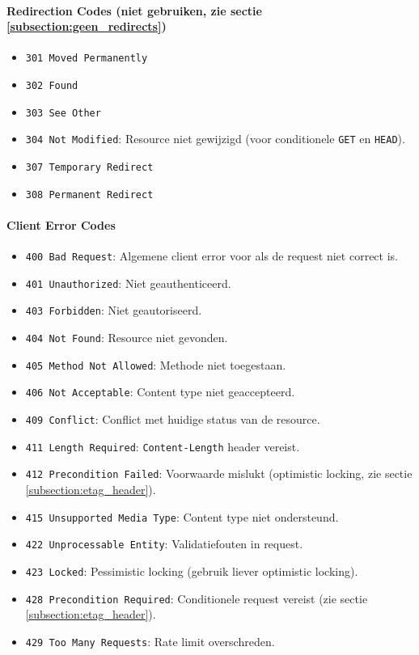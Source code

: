 \paragraph{Redirection Codes (niet gebruiken, zie sectie \ref{subsection:geen_redirects})}

\begin{itemize}
    \item \texttt{301 Moved Permanently}
    \item \texttt{302 Found}
    \item \texttt{303 See Other}
    \item \texttt{304 Not Modified}: Resource niet gewijzigd (voor conditionele \texttt{GET} en \texttt{HEAD}).
    \item \texttt{307 Temporary Redirect}
    \item \texttt{308 Permanent Redirect}
\end{itemize}

\paragraph{Client Error Codes}

\begin{itemize}
    \item \texttt{400 Bad Request}: Algemene client error voor als de request niet correct is.
    \item \texttt{401 Unauthorized}: Niet geauthenticeerd.
    \item \texttt{403 Forbidden}: Niet geautoriseerd.
    \item \texttt{404 Not Found}: Resource niet gevonden.
    \item \texttt{405 Method Not Allowed}: Methode niet toegestaan.
    \item \texttt{406 Not Acceptable}: Content type niet geaccepteerd.
    \item \texttt{409 Conflict}: Conflict met huidige status van de resource.
    \item \texttt{411 Length Required}: \texttt{Content-Length} header vereist.
    \item \texttt{412 Precondition Failed}: Voorwaarde mislukt (optimistic locking, zie sectie \ref{subsection:etag_header}).
    \item \texttt{415 Unsupported Media Type}: Content type niet ondersteund.
    \item \texttt{422 Unprocessable Entity}: Validatiefouten in request.
    \item \texttt{423 Locked}: Pessimistic locking (gebruik liever optimistic locking).
    \item \texttt{428 Precondition Required}: Conditionele request vereist (zie sectie \ref{subsection:etag_header}).
    \item \texttt{429 Too Many Requests}: Rate limit overschreden.
\end{itemize}

